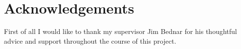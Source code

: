 


\begingroup

\let\clearpage\relax
\let\cleardoublepage\relax
\let\cleardoublepage\relax

\chapter*{Acknowledgements} %

First of all I would like to thank my supervisor Jim Bednar for his
thoughtful advice and support throughout the course of this project.

\endgroup
